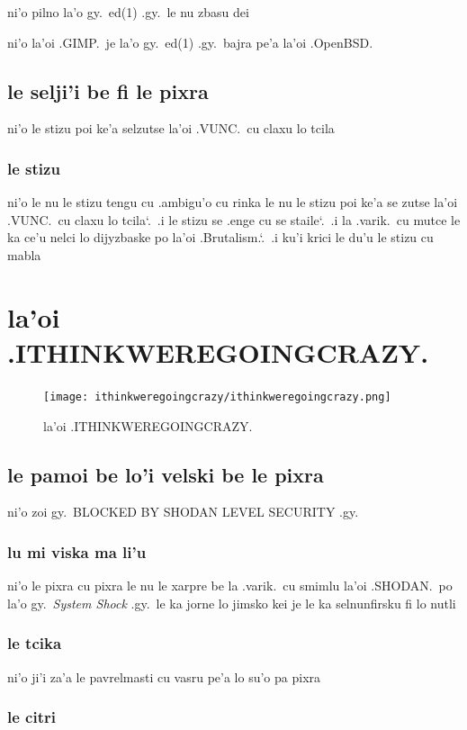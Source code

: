 \documentclass{report}
\newcommand\sds{\spacefactor\sfcode`.\ \space}
\begin{document}
ni'o pilno la'o gy.\ ed(1) .gy.\ le nu zbasu dei

ni'o la'oi .GIMP.\ je la'o gy.\ ed(1) .gy.\ bajra pe'a la'oi .OpenBSD.

\section{le selji'i be fi le pixra}
ni'o le stizu poi ke'a selzutse la'oi .VUNC.\ cu claxu lo tcila

\subsection{le stizu}
ni'o le nu le stizu tengu cu .ambigu'o cu rinka le nu le stizu poi ke'a se zutse la'oi .VUNC.\ cu claxu lo tcila\sds  .i le stizu se .enge cu se staile\sds  .i la .varik.\ cu mutce le ka ce'u nelci lo dijyzbaske po la'oi .Brutalism.\sds  .i ku'i krici le du'u le stizu cu mabla

\chapter{la'oi .ITHINKWEREGOINGCRAZY.}
\begin{figure}[ht]
	\centering
	\texttt{[image: ithinkweregoingcrazy/ithinkweregoingcrazy.png]}
	\caption[center]{la'oi .ITHINKWEREGOINGCRAZY.}
\end{figure}
\section{le pamoi be lo'i velski be le pixra}
ni'o zoi gy.\ BLOCKED BY SHODAN LEVEL SECURITY .gy.

\subsection{lu mi viska ma li'u}
ni'o le pixra cu pixra le nu le xarpre be la .varik.\ cu smimlu la'oi .SHODAN.\ po la'o gy.\ \textit{System Shock} .gy.\ le ka jorne lo jimsko kei je le ka selnunfirsku fi lo nutli

\subsection{le tcika}
ni'o ji'i za'a le pavrelmasti cu vasru pe'a lo su'o pa pixra

\subsection{le citri}
\end{document}
